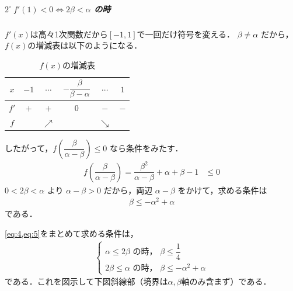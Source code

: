 \documentclass[../../main.tex]{subfiles}
\begin{document}
\subparagraph{$2^\circ \ f'(1) < 0 \iff 2\beta < \alpha$ の時}

$f'(x)$は高々1次関数だから$[-1,1]$で一回だけ符号を変える．
$\beta \ne \alpha$ だから，$f(x)$の増減表は以下のようになる．

\begin{table}[htb]
  \centering
  \caption{$f(x)$の増減表}
  \begin{tabular}{|c|c|c|c|c|c|}
    \hline
    $x$ & $-1$ & $\cdots$ & $-\dfrac{\beta}{\beta-\alpha}$ & $\cdots$ & $1$ \\
    \hline
    $f'$ & $+$ & $+$ & $0$ & $-$ & $-$ \\
    \hline
    $f$ & & $\nearrow$ & & $\searrow$ & \\
    \hline
  \end{tabular}
\end{table}

したがって，$f\left(\dfrac{\beta}{\alpha-\beta}\right) \le 0$ なら条件をみたす．
\begin{align}
  f\left(\dfrac{\beta}{\alpha-\beta}\right) = \dfrac{\beta^2}{\alpha-\beta} + \alpha + \beta - 1 &\le 0
\end{align}
$0 < 2\beta < \alpha$ より $\alpha - \beta > 0$ だから，両辺 $\alpha - \beta$ をかけて，求める条件は
\begin{align}
  \beta \le -\alpha^2 + \alpha \label{eq:5}
\end{align}
である．
\casesend

\cref{eq:4,eq:5}をまとめて求める条件は，
\begin{align}
  \begin{cases}
    \alpha \le 2\beta \text{ の時， } \beta \le \dfrac{1}{4} \\
    2\beta \le \alpha \text{ の時， } \beta \le -\alpha^2 + \alpha
  \end{cases} \label{eq:6}
\end{align}
である．これを図示して下図斜線部（境界は$\alpha, \beta$軸のみ含まず）である．
\end{document}
